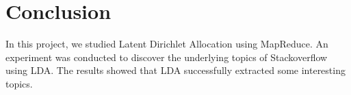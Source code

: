 \documentclass[conference]{IEEEtran}
\begin{document}
\section{Conclusion}
In this project, we studied Latent Dirichlet Allocation using MapReduce. An experiment was conducted to discover the underlying topics of Stackoverflow using LDA. The results showed that LDA successfully extracted some interesting topics.












%
%
%






\end{document}
